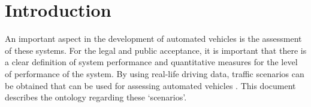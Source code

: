 \section{Introduction}
\label{sec:introduction}

\color{red}

An important aspect in the development of automated vehicles is the assessment of these systems. For the legal and public acceptance, it is important that there is a clear definition of system performance and quantitative measures for the level of performance of the system. By using real-life driving data, traffic scenarios can be obtained that can be used for assessing automated vehicles \cite{stellet2015taxonomy}. This document describes the ontology regarding these `scenarios'.


\color{black}
